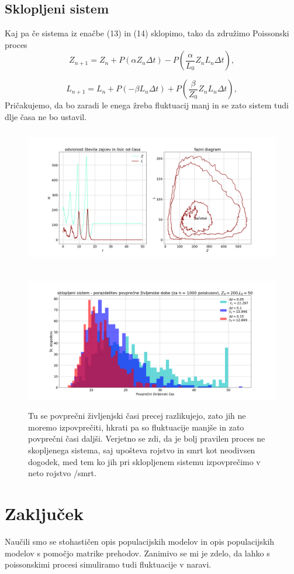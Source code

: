 \documentclass[11pt, a4paper]{article}
\begin{document}
 \subsection{Sklopljeni sistem}
Kaj pa če sistema iz enačbe (13) in (14) sklopimo, tako da združimo Poissonski proces 
\begin{equation}
Z_{n+1} = Z_{n} + P(\alpha Z_n \Delta t) -P(\frac{\alpha}{L_0} Z_n L_n \Delta t),
\end{equation}

\begin{equation}
L_{n+1} = L_{n} + P(-\beta L_n \Delta t) + P (\frac{\beta}{Z_0} Z_n L_n \Delta t),
\end{equation}
Pričakujemo, da bo zaradi le enega žreba fluktuacij manj in se zato sistem tudi dlje časa ne bo ustavil.
 \begin{figure}[H]
\centering

  \includegraphics[width=16cm, height=6cm]{tretja_8.png}

   
 \end{figure}
 \begin{figure}[H]
\centering

  \includegraphics[width=16cm, height=6cm]{tretja_7.png}
  \caption{Tu se povprečni življenjski časi precej razlikujejo, zato jih ne moremo izpovprečiti, hkrati pa so fluktuacije manjše in zato povprečni časi daljši. Verjetno se zdi, da je bolj pravilen proces ne skopljenega sistema, saj upošteva rojstvo in smrt kot neodivsen dogodek, med tem ko jih pri sklopljenem sistemu izpovprečimo v neto rojstvo /smrt.}  


   
 \end{figure}

\fi


\section{Zaključek}
Naučili smo se stohastičen opis populacijskih modelov in opis populacijskih modelov s pomočjo matrike prehodov. Zanimivo se mi je zdelo, da lahko s poissonskimi procesi simuliramo tudi fluktuacije v naravi.
\end{document}

